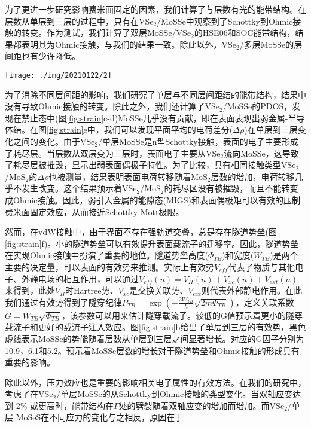 \documentclass[reprint, aps, prb, showkeys]{revtex4-2}
\begin{document}
为了更进一步研究影响费米面固定的因素，我们计算了与层数有光的能带结构。在层数从单层到三层的过程中，只有在VSe$_2$/MoSSe中观察到了Schottky到Ohmic接触的转变。作为测试，我们计算了双层MoSSe/VSe$_2$的HSE06和SOC能带结构，结果都表明其为Ohmic接触，与我们的结果一致。除此以外，VSe$_2$/多层MoSSe的层间距也有少许降低。
\begin{figure*}[t]
    \texttt{[image: ./img/20210122/2]}
    \caption{\label{fig:strain} 
    (a-b)沿着z方向的1L/2L/3L的VSe$_2$/MoSSe有效势，$\Phi_{TB}$给出了MoSSe($\Phi_{MoSSe}$)、vdW能隙($\Phi_{gap}$)的势能差，黑色虚线表示MoSSe的势能随着层数从单层到三层之间的增长；能带结构(c)、z方向VSe$_2$/MoSSe随着不同双轴应力形变的有效势场变化(d)；V原子的自旋密度在不同应力下在z方向的变化(e)。
    }
\end{figure*}
为了消除不同层间距的影响，我们研究了单层与不同层间距结的能带结构，结果中没有导致Ohmic接触的转变。除此之外，我们还计算了VSe$_2$/MoSSe的PDOS，发现在禁止态中(图\ref{fig:strain}c-d)MoSSe几乎没有贡献，即在表面表现出弱金属-半导体结。在图\ref{fig:strain}e中，我们可以发现平面平均的电荷差分($\Delta \rho$)在单层到三层变化之间的变化。由于VSe$_2$/单层MoSSe是n型Schottky接触，表面的电子主要形成了耗尽层。当层数从双层变为三层时，表面电子主要从VSe$_2$流向MoSSe，这导致了耗尽层被摧毁，显示出弱表面偶极子特性。为了比较，具有相同接触类型VSe$_2$/MoS$_2$的$\Delta \rho$也被测量，结果表明表面电荷转移随着MoS$_2$层数的增加，电荷转移几乎不发生改变。这个结果预示着VSe$_2$/MoS$_2$的耗尽区没有被摧毁，而且不能转变成Ohmic接触。因此，弱引入金属的能隙态(MIGS)和表面偶极矩可以有效的压制费米面固定效应，从而接近Schottky-Mott极限。

然而，在vdW接触中，由于界面不存在强轨道交叠，总是存在隧道势垒(图\ref{fig:strain}f)。小的隧道势垒可以有效提升表面载流子的迁移率。因此，隧道势垒在实现Ohmic接触中扮演了重要的地位。隧道势垒高度($\Phi_{TB}$)和宽度($W_{TB}$)是两个主要的决定量，可以表面的有效势来推测。实际上有效势$V_{eff}$代表了物质与其他电子、外静电场的相互作用，可以通过$V_{eff}(n) = V_H(n) + V_{xc}(n) + V_{ext}(n)$来得到，此处$V_H$时Hartree势、$V_{xc}$是交换关联势、$V_{ext}$则代表外部静电作用。在此我们通过有效势得到了隧穿纪律$P_{TB} = \exp \left( -\frac{2W_{TB}}{\hbar} \sqrt{2m\Phi_{TB}} \right)$，定义关联系数$G = W_{TB} \sqrt{\Phi_{TB}}$，该参数可以用来估计隧穿载流子。较低的G值预示着更小的隧穿载流子和更好的载流子注入效应。图\ref{fig:strain}b给出了单层到三层的有效势，黑色虚线表示MoSSe的势能随着层数从单层到三层之间显著增长。对应的G因子分别为10.9，6.1和5.2。预示着MoSSe层数的增长对于隧道势垒和Ohmic接触的形成具有重要的影响。

除此以外，压力效应也是重要的影响相关电子属性的有效方法。在我们的研究中，考虑了在VSe$_2$/单层MoSSe的从Schottky到Ohmic接触的类型变化。当双轴应变达到 2\% 或更高时，能带结构在$\Gamma$处的劈裂随着双轴应变的增加而增加。而VSe$_2$/单层 MoSeS在不同应力的变化与之相反，原因在于
\end{document}

